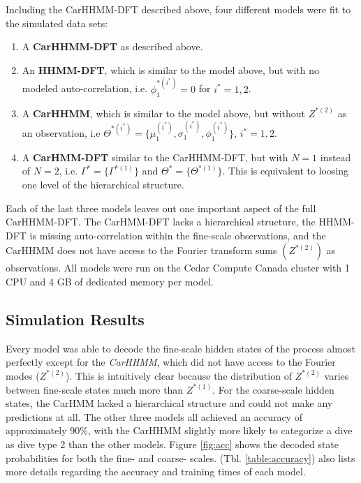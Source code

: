 Including the CarHHMM-DFT described above, four different models were fit to the simulated data sets:
\begin{enumerate}
    \item A \textbf{CarHHMM-DFT} as described above.
    \item An \textbf{HHMM-DFT}, which is similar to the model above, but with no modeled auto-correlation, i.e. $\phi_1^{*(i^*)} = 0$ for $i^* = 1,2$.
    \item A \textbf{CarHHMM}, which is similar to the model above, but without $Z^{*(2)}$ as an observation, i.e $\Theta^{*(i^*)} = \{\mu_1^{(i^*)},\sigma_1^{(i^*)},\phi_1^{(i^*)}\}$, $i^* = 1,2$.
    \item A \textbf{CarHMM-DFT} similar to the CarHHMM-DFT, but with $N=1$ instead of $N=2$, i.e. $\Gamma^* = \{\Gamma^{*(1)}\}$ and $\Theta^* = \{\Theta^{*(1)}\}$. This is equivalent to loosing one level of the hierarchical structure.
\end{enumerate}
%
Each of the last three models leaves out one important aspect of the full CarHHMM-DFT. The CarHMM-DFT lacks a hierarchical structure, the HHMM-DFT is missing auto-correlation within the fine-scale observations, and the CarHHMM does not have access to the Fourier transform sums $(Z^{*(2)})$ as observations. All models were run on the Cedar Compute Canada cluster with 1 CPU and 4 GB of dedicated memory per model.

\subsection{Simulation Results}

Every model was able to decode the fine-scale hidden states of the process almost perfectly except for the \textit{CarHHMM}, which did not have access to the Fourier modes ($Z^{*(2)}$). This is intuitively clear because the distribution of $Z^{*(2)}$ varies between fine-scale states much more than $Z^{*(1)}$. For the coarse-scale hidden states, the CarHMM lacked a hierarchical structure and could not make any predictions at all. The other three models all achieved an accuracy of approximately 90\%, with the CarHHMM slightly more likely to categorize a dive as dive type 2 than the other models. Figure \ref{fig:acc} shows the decoded state probabilities for both the fine- and coarse- scales. (Tbl. \ref{table:accuracy}) also lists more details regarding the accuracy and training times of each model.


